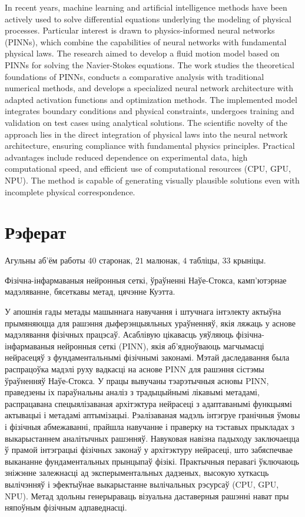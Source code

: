 In recent years, machine learning and artificial intelligence methods have been actively used 
to solve differential equations underlying the modeling of physical processes. 
Particular interest is drawn to physics-informed neural networks (PINNs), which 
combine the capabilities of neural networks with fundamental physical laws. The research aimed 
to develop a fluid motion model based on PINNs for solving the Navier-Stokes equations. 
The work studies the theoretical foundations of PINNs, conducts a 
comparative analysis with traditional numerical methods, and develops a specialized 
neural network architecture with adapted activation functions and optimization methods. 
The implemented model integrates boundary conditions and physical constraints, undergoes training 
and validation on test cases using analytical solutions. 
The scientific novelty of the approach lies in the direct integration of physical laws into the 
neural network architecture, ensuring compliance with fundamental physics principles. Practical 
advantages include reduced dependence on experimental data, high computational speed, 
and efficient use of computational resources (CPU, GPU, NPU). 
The method is capable of generating visually plausible solutions even with incomplete physical correspondence.

\chapter*{Рэферат}
Агульны аб'ём работы $40$ старонак, $21$ малюнак, $4$ табліцы, $33$ крыніцы.

Фізічна-інфармаваныя нейронныя сеткі, ўраўненні Наўе-Стокса, 
камп'ютэрнае мадэляванне, бясеткавы метад, цячэнне Куэтта.

У апошнія гады метады машыннага навучання і штучнага інтэлекту актыўна прымяняюцца 
для рашэння дыферэнцыяльных ураўненняў, якія ляжаць у аснове мадэлявання фізічных працэсаў. 
Асаблівую цікавасць уяўляюць фізічна-інфармаваныя нейронныя сеткі (PINN), якія 
аб'ядноўваюць магчымасці нейрасецяў з фундаментальнымі фізічнымі законамі. Мэтай даследавання 
была распрацоўка мадэлі руху вадкасці на аснове PINN для рашэння сістэмы ўраўненняў Наўе-Стокса. 
У працы вывучаны тэарэтычныя асновы PINN, праведзены іх 
параўнальны аналіз з традыцыйнымі лікавымі метадамі, распрацавана спецыялізаваная 
архітэктура нейрасеці з адаптаванымі функцыямі актывацыі і метадамі аптымізацыі. 
Рэалізаваная мадэль інтэгруе гранічныя ўмовы і фізічныя абмежаванні, прайшла навучанне 
і праверку на тэставых прыкладах з выкарыстаннем аналітычных рашэнняў. 
Навуковая навізна падыходу заключаецца ў прамой інтэграцыі фізічных законаў у архітэктуру 
нейрасеці, што забяспечвае выкананне фундаментальных прынцыпаў фізікі. Практычныя 
перавагі ўключаюць зніжэнне залежнасці ад эксперыментальных дадзеных, высокую хуткасць 
вылічэнняў і эфектыўнае выкарыстанне вылічальных рэсурсаў (CPU, GPU, NPU). 
Метад здольны генерыраваць візуальна даставерныя рашэнні нават пры няпоўным фізічным адпаведнасці.

